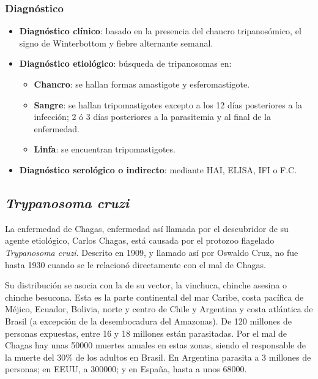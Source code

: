 \subsubsection{Diagnóstico}
\begin{itemize}[itemsep=0pt,parsep=0pt,topsep=0pt,partopsep=0pt]
	\item \textbf{Diagnóstico clínico}: basado en la presencia del chancro tripanosómico, el signo de Winterbottom y fiebre alternante semanal.
	\item \textbf{Diagnóstico etiológico}: búsqueda de tripanosomas en:
	\begin{itemize}[itemsep=0pt,parsep=0pt,topsep=0pt,partopsep=0pt]
		\item \textbf{Chancro}: se hallan formas amastigote y esferomastigote.
		\item \textbf{Sangre}: se hallan tripomastigotes excepto a los 12 días posteriores a la infección; 2 ó 3 días posteriores a la parasitemia y al final de la enfermedad.
		\item \textbf{Linfa}: se encuentran tripomastigotes.
	\end{itemize}
	\item \textbf{Diagnóstico serológico o indirecto}: mediante HAI, ELISA, IFI o F.C.
\end{itemize}
\newpage
\subsection{\textit{Trypanosoma cruzi}}
La enfermedad de Chagas, enfermedad así llamada por el descubridor de su agente etiológico, Carlos Chagas, está causada por el protozoo flagelado \textit{Trypanosoma cruzi}. Descrito en 1909, y llamado así por Oswaldo Cruz, no fue hasta 1930 cuando se le relacionó directamente con el mal de Chagas.

Su distribución se asocia con la de su vector, la vinchuca, chinche asesina o chinche besucona. Esta es la parte continental del mar Caribe, costa pacífica de Méjico, Ecuador, Bolivia, norte y centro de Chile y Argentina y costa atlántica de Brasil (a excepción de la desembocadura del Amazonas). De 120 millones de personas expuestas, entre 16 y 18 millones están parasitadas. Por el mal de Chagas hay unas 50000 muertes anuales en estas zonas, siendo el responsable de la muerte del 30\% de los adultos en Brasil. En Argentina parasita a 3 millones de personas; en EEUU, a 300000; y en España, hasta a unos 68000.
